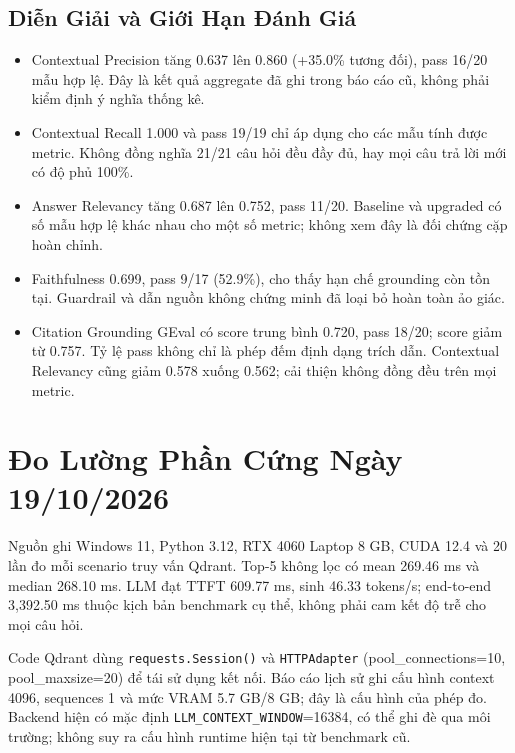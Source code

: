 

\subsection{Diễn Giải và Giới Hạn Đánh Giá}
\begin{itemize}
\item Contextual Precision tăng 0.637 lên 0.860 (+35.0\% tương đối), pass 16/20 mẫu hợp lệ. Đây là kết quả aggregate đã ghi trong báo cáo cũ, không phải kiểm định ý nghĩa thống kê.
\item Contextual Recall 1.000 và pass 19/19 chỉ áp dụng cho các mẫu tính được metric. Không đồng nghĩa 21/21 câu hỏi đều đầy đủ, hay mọi câu trả lời mới có độ phủ 100\%.
\item Answer Relevancy tăng 0.687 lên 0.752, pass 11/20. Baseline và upgraded có số mẫu hợp lệ khác nhau cho một số metric; không xem đây là đối chứng cặp hoàn chỉnh.
\item Faithfulness 0.699, pass 9/17 (52.9\%), cho thấy hạn chế grounding còn tồn tại. Guardrail và dẫn nguồn không chứng minh đã loại bỏ hoàn toàn ảo giác.
\item Citation Grounding GEval có score trung bình 0.720, pass 18/20; score giảm từ 0.757. Tỷ lệ pass không chỉ là phép đếm định dạng trích dẫn. Contextual Relevancy cũng giảm 0.578 xuống 0.562; cải thiện không đồng đều trên mọi metric.
\end{itemize}

\section{Đo Lường Phần Cứng Ngày 19/10/2026}
Nguồn  ghi Windows 11, Python 3.12, RTX 4060 Laptop 8 GB, CUDA 12.4 và 20 lần đo mỗi scenario truy vấn Qdrant. Top-5 không lọc có mean 269.46 ms và median 268.10 ms. LLM đạt TTFT 609.77 ms, sinh 46.33 tokens/s; end-to-end 3,392.50 ms thuộc kịch bản benchmark cụ thể, không phải cam kết độ trễ cho mọi câu hỏi.



Code Qdrant dùng \texttt{requests.Session()} và \texttt{HTTPAdapter} (pool\_connections=10, pool\_maxsize=20) để tái sử dụng kết nối. Báo cáo lịch sử ghi cấu hình context 4096, sequences 1 và mức VRAM 5.7 GB/8 GB; đây là cấu hình của phép đo. Backend hiện có mặc định \texttt{LLM\_CONTEXT\_WINDOW}=16384, có thể ghi đè qua môi trường; không suy ra cấu hình runtime hiện tại từ benchmark cũ.

